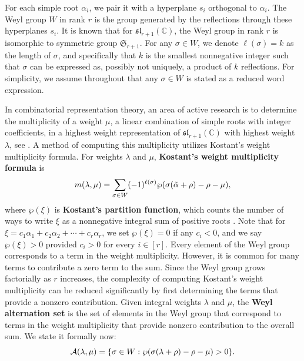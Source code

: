 \documentclass[10pt]{article}
\newcommand{\speclin}[0]{\mathfrak{sl}_{r+1}(\mathbb{C})}
\newcommand{\hr}[0]{\Tilde{\alpha}}
\begin{document}
For each simple root $\alpha_i$, we pair it with a hyperplane $s_i$ orthogonal to $\alpha_i$. The Weyl group $W$ in rank $r$ is the group generated by the reflections through these hyperplanes $s_i$. It is known that for $\speclin$, the Weyl group in rank $r$ is isomorphic to symmetric group $\mathfrak{S}_{r+1}$. For any $\sigma\in W$, we denote $\ell(\sigma)=k$ as the length of $\sigma$, and specifically that $k$ is the smallest nonnegative integer such that $\sigma$ can be expressed as, possibly not uniquely, a product of $k$ reflections.
For simplicity, we assume throughout that any $\sigma\in W$ is stated as a reduced word expression.

In combinatorial representation theory, an area of active research 
is to determine the multiplicity of a weight $\mu$, a linear combination of simple roots with integer coefficients, in a highest weight representation of $\speclin$ with highest weight $\lambda$, see \cite{HarrisThesis, harry2024computingqmultiplicitypositiveroots, Harris_Lescinsky_Mabie_2018,visualizing}. A method of computing this multiplicity utilizes Kostant's weight multiplicity formula.
For weights $\lambda$ and $\mu$, \textbf{Kostant's weight multiplicity formula} is 
\begin{equation}
m(\lambda,\mu)=\sum_{\sigma\in W} (-1)^{\ell(\sigma)}\wp(\sigma(\hr+\rho)-\rho-\mu),\notag
\end{equation}
    where $\wp(\xi)$ is \textbf{Kostant's partition function}, which counts the number of ways to write $\xi$ as a nonnegative integral sum of positive roots \cite{Goodman_Wallach_2009}.
Note that for $\xi=c_1\alpha_1+c_2\alpha_2+\cdots+c_r\alpha_r$, we set $\wp(\xi)=0$ if any $c_i <0$, and we say $\wp(\xi)>0$ provided $c_i>0$ for every $i\in[r]$. 
Every element of the Weyl group corresponds to a term in the weight multiplicity. However, it is common for many terms to contribute a zero term to the sum. Since the Weyl group grows factorially as $r$ increases, the complexity of computing Kostant's weight multiplicity can be reduced significantly by first determining the terms that provide a nonzero contribution.
Given integral weights $\lambda$ and $\mu$, the \textbf{Weyl alternation set} is the set of elements in the Weyl group that correspond to terms in the weight multiplicity that provide nonzero contribution to the overall sum. We state it formally now:
    \begin{equation}\label{eq: defn of alternation set}
        \mathcal{A}(\lambda,\mu)=\{\sigma\in W:\wp(\sigma(\lambda+\rho)-\rho-\mu)>0\}.\notag
    \end{equation} 
\end{document}
